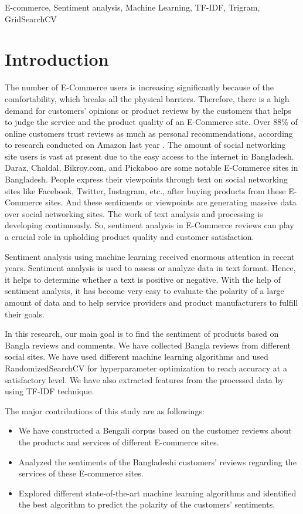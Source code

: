 \documentclass[conference]{IEEEtran}
\begin{document}
\begin{IEEEkeywords}
E-commerce, Sentiment analysis, Machine Learning, TF-IDF, Trigram, GridSearchCV 
\end{IEEEkeywords}


\section{Introduction}
The number of E-Commerce users is increasing significantly because of the comfortability, which breaks all the physical barriers. Therefore, there is a high demand for customers' opinions or product reviews by the customers that helps to judge the service and the product quality of an E-Commerce site. Over 88\% of online customers trust reviews as much as personal recommendations, according to research conducted on Amazon last year \cite{b1}. The amount of social networking site users is vast at present due to the easy access to the internet in Bangladesh. Daraz, Chaldal, Bikroy.com, and Pickaboo are some notable E-Commerce sites in Bangladesh. People express their viewpoints through text on social networking sites like Facebook, Twitter, Instagram, etc., after buying products from these E-Commerce sites. And these sentiments or viewpoints are generating massive data over social networking sites. The work of text analysis and processing is developing continuously. So, sentiment analysis in E-Commerce reviews can play a crucial role in upholding product quality and customer satisfaction.    \par
Sentiment analysis using machine learning received enormous attention in recent years. Sentiment analysis is used to assess or analyze data in text format. Hence, it helps to determine whether a text is positive or negative. With the help of sentiment analysis, it has become very easy to evaluate the polarity of a large amount of data and to help service providers and product manufacturers to fulfill their goals. \par
In this research, our main goal is to find the sentiment of products based on Bangla reviews and comments. We have collected Bangla reviews from different social sites. We have used different machine learning algorithms and used RandomizedSearchCV for hyperparameter optimization to reach accuracy at a satisfactory level. We have also extracted features from the processed data by using TF-IDF technique. \par
The major contributions of this study are as followings:
\begin{itemize}
\vspace{1mm}
\item We have constructed a Bengali corpus based on the customer reviews about the products and services of different E-commerce sites.     
\vspace{1mm}
\item Analyzed the sentiments of the Bangladeshi customers' reviews regarding the services of these E-commerce sites.
\vspace{1mm}
\item Explored different state-of-the-art machine learning algorithms and identified the best algorithm to predict the polarity of the customers' sentiments. 
\end{itemize}
\end{document}
